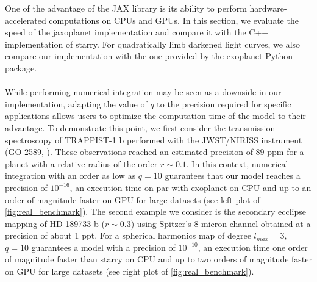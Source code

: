 \documentclass[modern]{aastex631}
\begin{document}
One of the advantage of the \textsf{JAX} library is its ability to perform hardware-accelerated computations on CPUs and GPUs. In this section, we evaluate the speed of the \textsf{jaxoplanet} implementation and compare it with the C++ implementation of \textsf{starry}. For quadratically limb darkened light curves, we also compare our implementation with the one provided by the \textsf{exoplanet} Python package.\\\\
While performing numerical integration may be seen as a downside in our implementation, adapting the value of $q$ to the precision required for specific applications allows users to optimize the computation time of the model to their advantage. To demonstrate this point, we first consider the transmission spectroscopy of TRAPPIST-1 b performed with the JWST/NIRISS instrument (GO-2589, \citealt{Lim2023}). These observations reached an estimated precision of 89 ppm for a planet with a relative radius of the order $r\sim0.1$. In this context, numerical integration with an order as low as $q=10$ guarantees that our model reaches a precision of $10^{-16}$, an execution time on par with \textsf{exoplanet} on CPU and up to an order of magnitude faster on GPU for large datasets (see left plot of \autoref{fig:real_benchmark}). The second example we consider is the secondary ecclipse mapping of HD 189733 b ($r\sim0.3$) using Spitzer's 8 micron channel \citep{majeau2012} obtained at a precision of about 1 ppt. For a spherical harmonics map of degree $l_{max}=3$, $q=10$ guarantees a model with a precision of $10^{-10}$, an execution time one order of magnitude faster than \textsf{starry} on CPU and up to two orders of magnitude faster on GPU for large datasets (see right plot of \autoref{fig:real_benchmark}).\\\\
\end{document}
